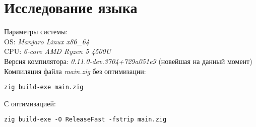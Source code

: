 \section{Исследование языка}

Параметры системы:\\
OS: \textit{Manjaro Linux x86\_64}\\
CPU: \textit{6-core AMD Ryzen 5 4500U}\\
Версия компилятора: \textit{0.11.0-dev.3704+729a051e9} (новейшая на данный момент)\\

Компиляция файла \textit{main.zig} без оптимизации:\\
\begin{lstlisting}
zig build-exe main.zig
\end{lstlisting}

С оптимизацией:\\
\begin{lstlisting}
zig build-exe -O ReleaseFast -fstrip main.zig
\end{lstlisting}





